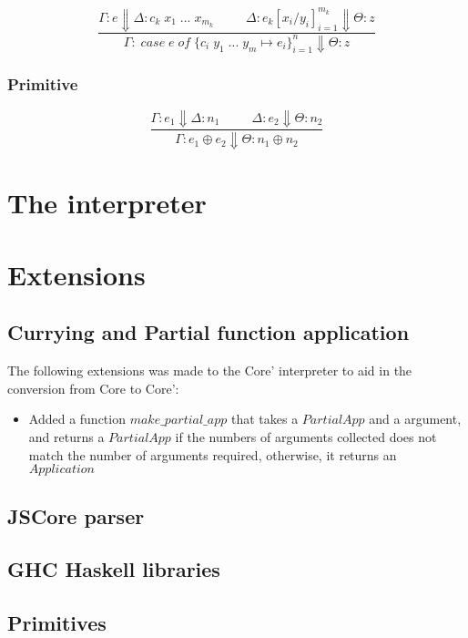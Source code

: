 \begin{equation}
\dfrac{ \Gamma : e \Downarrow \Delta : c_k \; x_1 \; ... \; x_{m_k}  \;\;\;\;\;\;\;\;\; \Delta : e_k [x_i/y_i]^{m_k}_{i=1} \Downarrow \Theta : z }{ \Gamma : \; case \; e \; of \; \{c_i \; y_1 \; ... \; y_m \mapsto e_i\}^{n}_{i=1} \Downarrow \Theta : z }
\end{equation}

\subsubsection{Primitive}

\begin{equation}
\dfrac{\Gamma : e_1 \Downarrow \Delta : n_1  \;\;\;\;\;\;\;\;\; \Delta : e_2 \Downarrow \Theta : n_2 }{ \Gamma : e_1 \oplus e_2 \Downarrow \Theta : n_1 \oplus n_2 }
\end{equation}





\section{The interpreter}
















\section{Extensions}


\subsection{Currying and Partial function application}



The following extensions was made to the Core' interpreter to aid in the conversion from
Core to Core':

\begin{itemize}
\item Added a function $make\_partial\_app$ that takes a $PartialApp$ and a argument, and returns
a $PartialApp$ if the numbers of arguments collected does not match the number of arguments required,
otherwise, it returns an $Application$
\end{itemize}






\subsection{JSCore parser}

\subsection{GHC Haskell libraries}



\subsection{Primitives}


